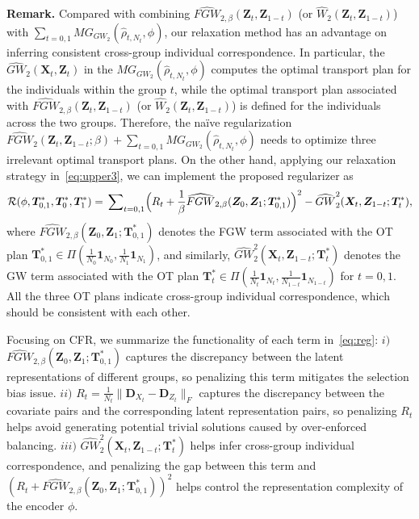 \documentclass{article}
\begin{document}
\textbf{Remark.} Compared with combining $\widehat{FGW}_{2,\beta}(\bm{Z}_{t},\bm{Z}_{1-t})$ (or $\widehat{W}_2(\bm{Z}_{t},\bm{Z}_{1-t})$) with $\sum_{t=0,1}MG_{GW_2}(\hat{\rho}_{t,N_t},\phi)$, our relaxation method has an advantage on inferring consistent cross-group individual correspondence. 
In particular, the $\widehat{GW}_2(\bm{X}_t,\bm{Z}_t)$ in the $MG_{GW_2}(\hat{\rho}_{t,N_t},\phi)$ computes the optimal transport plan for the individuals within the group $t$, while the optimal transport plan associated with $\widehat{FGW}_{2,\beta}(\bm{Z}_{t},\bm{Z}_{1-t})$ (or $\widehat{W}_2(\bm{Z}_{t},\bm{Z}_{1-t})$) is defined for the individuals across the two groups. 
Therefore, the na\"{i}ve regularization $\widehat{FGW}_2(\bm{Z}_{t},\bm{Z}_{1-t};\beta)+\sum_{t=0,1}MG_{GW_2}(\hat{\rho}_{t,N_t},\phi)$ needs to optimize three irrelevant optimal transport plans.
On the other hand, applying our relaxation strategy in~\eqref{eq:upper3}, we can implement the proposed regularizer as
\begin{eqnarray}\label{eq:reg}
    \mathcal{R}(\phi,\bm{T}_{0,1}^*,\bm{T}_{0}^*,\bm{T}_1^*)=\sideset{}{_{t=0,1}}\sum\Bigl(R_t + \frac{1}{\beta}\widehat{FGW}_{2,\beta}(\bm{Z}_{0},\bm{Z}_{1};\bm{T}_{0,1}^*)\Bigr)^2-\widehat{GW}_2^2(\bm{X}_{t},\bm{Z}_{1-t};\bm{T}_{t}^*),
\end{eqnarray}
where $\widehat{FGW}_{2,\beta}(\bm{Z}_{0},\bm{Z}_{1};\bm{T}_{0,1}^*)$ denotes the FGW term associated with the OT plan $\bm{T}_{0,1}^*\in\Pi(\frac{1}{N_0}\bm{1}_{N_0},\frac{1}{N_{1}}\bm{1}_{N_{1}})$, and similarly,  $\widehat{GW}_2^2(\bm{X}_{t},\bm{Z}_{1-t};\bm{T}_{t}^*)$ denotes the GW term associated with the OT plan $\bm{T}_t^*\in\Pi(\frac{1}{N_t}\bm{1}_{N_t},\frac{1}{N_{1-t}}\bm{1}_{N_{1-t}})$ for $t=0,1$. 
All the three OT plans indicate cross-group individual correspondence, which should be consistent with each other.

Focusing on CFR, we summarize the functionality of each term in~\eqref{eq:reg}: $i)$ $\widehat{FGW}_{2,\beta}(\bm{Z}_{0},\bm{Z}_{1};\bm{T}_{0,1}^*)$ captures the discrepancy between the latent representations of different groups, so penalizing this term mitigates the selection bias issue. $ii)$ $R_t=\frac{1}{N_t}\|\bm{D}_{X_t}-\bm{D}_{Z_t}\|_F$ captures the discrepancy between the covariate pairs and the corresponding latent representation pairs, so penalizing $R_t$ helps avoid generating potential trivial solutions caused by over-enforced balancing.
$iii)$ $\widehat{GW}_2^2(\bm{X}_{t},\bm{Z}_{1-t};\bm{T}_{t}^*)$ helps infer cross-group individual correspondence, and penalizing the gap between this term and $(R_t+\widehat{FGW}_{2,\beta}(\bm{Z}_{0},\bm{Z}_{1};\bm{T}_{0,1}^*))^2$ helps control the representation complexity of the encoder $\phi$.
\end{document}
